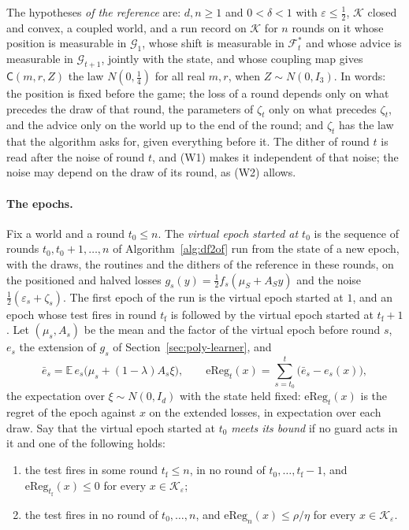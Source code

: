 \documentclass[11pt]{amsart}
\theoremstyle{definition}
\numberwithin{equation}{section}
\newcommand{\E}{\mathbb{E}}
\newcommand{\cK}{\mathcal{K}}
\newcommand{\cG}{\mathscr{G}}
\newcommand{\cF}{\mathscr{F}}
\begin{document}
The hypotheses \emph{of the reference} are: $d,n\ge1$ and $0<\delta<1$ with $\varepsilon\le\frac12$, $\cK$ closed and convex, a coupled world, and a run record on $\cK$ for $n$ rounds on it whose position is measurable in $\cG_1$, whose shift is measurable in $\cF^*_t$ and whose advice is measurable in $\cG_{t+1}$, jointly with the state, and whose coupling map gives $\mathsf C(m,r,Z)$ the law $N(0,\frac14)$ for all real $m,r$, when $Z\sim N(0,I_3)$. In words: the position is fixed before the game; the loss of a round depends only on what precedes the draw of that round, the parameters of $\zeta_t$ only on what precedes $\zeta_t$, and the advice only on the world up to the end of the round; and $\zeta_t$ has the law that the algorithm asks for, given everything before it. The dither of round $t$ is read after the noise of round $t$, and (W1) makes it independent of that noise; the noise may depend on the draw of its round, as (W2) allows.

\paragraph{The epochs.} Fix a world and a round $t_0\le n$. The \emph{virtual epoch started at $t_0$} is the sequence of rounds $t_0,t_0+1,\dots,n$ of Algorithm~\ref{alg:df2of} run from the state of a new epoch, with the draws, the routines and the dithers of the reference in these rounds, on the positioned and halved losses $g_s(y)=\frac12f_s(\mu_S+A_Sy)$ and the noise $\frac12(\varepsilon_s+\zeta_s)$. The first epoch of the run is the virtual epoch started at $1$, and an epoch whose test fires in round $t_{\mathrm f}$ is followed by the virtual epoch started at $t_{\mathrm f}+1$. Let $(\mu_s,A_s)$ be the mean and the factor of the virtual epoch before round $s$, $e_s$ the extension of $g_s$ of Section~\ref{sec:poly-learner}, and
\[
\bar e_s=\E\,e_s\bigl(\mu_s+(1-\lambda)A_s\xi\bigr),\qquad\mathrm{eReg}_t(x)=\sum_{s=t_0}^t\bigl(\bar e_s-e_s(x)\bigr),
\]
the expectation over $\xi\sim N(0,I_d)$ with the state held fixed: $\mathrm{eReg}_t(x)$ is the regret of the epoch against $x$ on the extended losses, in expectation over each draw. Say that the virtual epoch started at $t_0$ \emph{meets its bound} if no guard acts in it and one of the following holds:
\begin{enumerate}[label=(\Alph*)]
\item the test fires in some round $t_{\mathrm f}\le n$, in no round of $t_0,\dots,t_{\mathrm f}-1$, and $\mathrm{eReg}_{t_{\mathrm f}}(x)\le0$ for every $x\in\cK_\varepsilon$;
\item the test fires in no round of $t_0,\dots,n$, and $\mathrm{eReg}_n(x)\le\rho/\eta$ for every $x\in\cK_\varepsilon$.
\end{enumerate}
\end{document}
